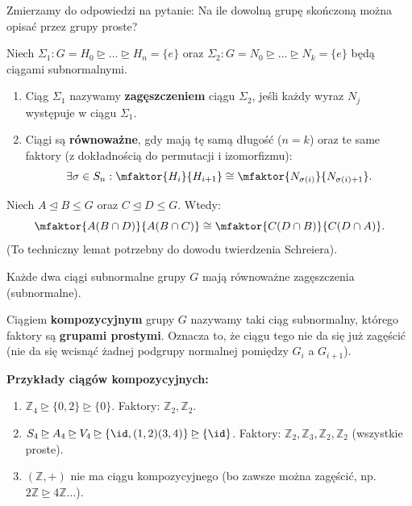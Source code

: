 Zmierzamy do odpowiedzi na pytanie: Na ile dowolną grupę skończoną można opisać przez grupy proste?

\begin{definition}
	Niech $\Sigma_1: G = H_0 \unrhd \dots \unrhd H_n = \{e\}$ oraz $\Sigma_2: G = N_0 \unrhd \dots \unrhd N_k = \{e\}$ będą ciągami subnormalnymi.
	\begin{enumerate}[label=\arabic*.]
		\item Ciąg $\Sigma_1$ nazywamy \textbf{zagęszczeniem} ciągu $\Sigma_2$, jeśli każdy wyraz $N_j$ występuje w ciągu $\Sigma_1$.
		\item Ciągi są \textbf{równoważne}, gdy mają tę samą długość ($n=k$) oraz te same faktory (z dokładnością do permutacji i izomorfizmu):
		\[ \exists \sigma \in S_n : \mfaktor{H_{i}}{H_{i+1}} \cong \mfaktor{N_{\sigma(i)}}{N_{\sigma(i)+1}}. \]
	\end{enumerate}
\end{definition} 

\begin{theorem}
	Niech $A \unlhd B \le G$ oraz $C \unlhd D \le G$. Wtedy:
	\[ \mfaktor{A(B \cap D)}{A(B \cap C)} \cong \mfaktor{C(D \cap B)}{C(D \cap A)}. \]
	(To techniczny lemat potrzebny do dowodu twierdzenia Schreiera).
\end{theorem}

\begin{theorem}
	Każde dwa ciągi subnormalne grupy $G$ mają równoważne zagęszczenia (subnormalne).
\end{theorem} 

\begin{definition}
	Ciągiem \textbf{kompozycyjnym} grupy $G$ nazywamy taki ciąg subnormalny, którego faktory są \textbf{grupami prostymi}.
	Oznacza to, że ciągu tego nie da się już zagęścić (nie da się wcisnąć żadnej podgrupy normalnej pomiędzy $G_i$ a $G_{i+1}$).
\end{definition} 

\textbf{Przykłady ciągów kompozycyjnych:}
\begin{enumerate}[label=\arabic*.]
	\item $\mathbb{Z}_4 \unrhd \{0,2\} \unrhd \{0\}$. Faktory: $\mathbb{Z}_2, \mathbb{Z}_2$.
	\item $S_4 \unrhd A_4 \unrhd V_4 \unrhd \{ \id, (1,2)(3,4) \} \unrhd \{\id\}$. Faktory: $\mathbb{Z}_2, \mathbb{Z}_3, \mathbb{Z}_2, \mathbb{Z}_2$ (wszystkie proste).
	\item $(\mathbb{Z}, +)$ nie ma ciągu kompozycyjnego (bo zawsze można zagęścić, np. $2\mathbb{Z} \unrhd 4\mathbb{Z} \dots$).
\end{enumerate}

